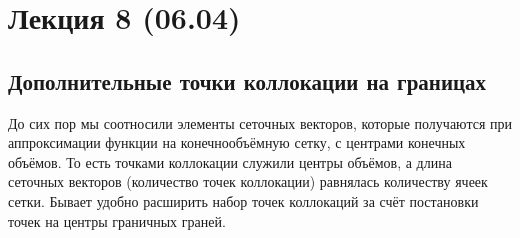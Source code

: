 \section{Лекция 8 (06.04)}

\subsection{Дополнительные точки коллокации на границах}
До сих пор мы соотносили
элементы сеточных векторов, которые получаются при аппроксимации функции на конечнообъёмную сетку,
с центрами конечных объёмов.
То есть точками коллокации служили центры объёмов,
а длина сеточных векторов (количество точек коллокации)
равнялась количеству ячеек сетки.
Бывает удобно расширить набор точек коллокаций за счёт
постановки точек на центры граничных граней.

